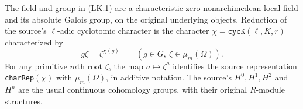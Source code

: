 \begin{proposition}
\label{prop:lk-identifications}
The field and group in (LK.1) are a characteristic-zero nonarchimedean
local field and its absolute Galois group, on the original underlying
objects.  Reduction of the source's $\ell$-adic cyclotomic character is
the character $\chi=\texttt{cycK}(\ell,K,r)$ characterized by
\[
   g\zeta=\zeta^{\chi(g)}\qquad
   (g\in G,\ \zeta\in\mu_m(\Omega)).
   \tag{LK.2}
\]
For any primitive $m$th root $\zeta$, the map
$a\mapsto\zeta^a$ identifies the source representation
\texttt{charRep}$(\chi)$ with $\mu_m(\Omega)$, in additive notation.
The source's $H^0,H^1,H^2$ and $H^n$ are the usual continuous
cohomology groups, with their original $R$-module structures.
\end{proposition}

